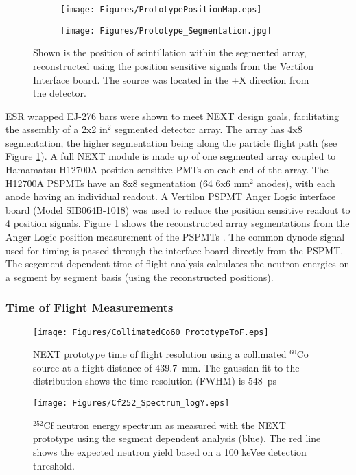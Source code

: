 \begin{figure}[ht]
  \begin{subfigure}{0.5\linewidth}
  \texttt{[image: Figures/PrototypePositionMap.eps]}
 \end{subfigure}%
  \begin{subfigure}{0.5\linewidth}
  \texttt{[image: Figures/Prototype\_Segmentation.jpg]}
 \end{subfigure}%
  \caption{Shown is the position of scintillation within the segmented array, reconstructed using the position sensitive signals from the Vertilon Interface board. The source was located in the +X direction from the detector.}
  \label{fig:PSPMTImage}
\end{figure}

ESR wrapped EJ-276 bars were shown to meet NEXT design goals, facilitating the assembly of a 2x2 in$^{2}$ segmented detector array. The array has 4x8 segmentation, the higher segmentation being along the particle flight path (see Figure \ref{fig:PSPMTImage}). A full NEXT module is made up of one segmented array coupled to Hamamatsu H12700A position sensitive PMTs on each end of the array. The H12700A PSPMTs have an 8x8 segmentation (64 6x6 mm$^{2}$ anodes), with each anode having an individual readout. A Vertilon PSPMT Anger Logic interface board (Model SIB064B-1018) was used to reduce the position sensitive readout to 4 position signals. Figure \ref{fig:PSPMTImage} shows the reconstructed array segmentations from the Anger Logic position measurement of the PSPMTs \cite{ANGER}. The common dynode signal used for timing is passed through the interface board directly from the PSPMT. The segement dependent time-of-flight analysis calculates the neutron energies on a segment by segment basis (using the reconstructed positions).

\subsubsection{Time of Flight Measurements}
\begin{figure}[tp]
 \centering
 \texttt{[image: Figures/CollimatedCo60\_PrototypeToF.eps]}
 \caption{NEXT prototype time of flight resolution using a collimated $^{60}$Co source at a flight distance of 439.7~mm. The gaussian fit to the distribution shows the time resolution (FWHM) is 548~ps}
 \label{fig:CollimatedCoToF}
\end{figure}
\begin{figure}[tb]
  \centering
  \texttt{[image: Figures/Cf252\_Spectrum\_logY.eps]}
  \caption{$^{252}$Cf neutron energy spectrum as measured with the NEXT prototype using the segment dependent analysis (blue). The red line shows the expected neutron yield based on a 100 keVee detection threshold.}
  \label{fig:Cf252Spectrum}
\end{figure}


